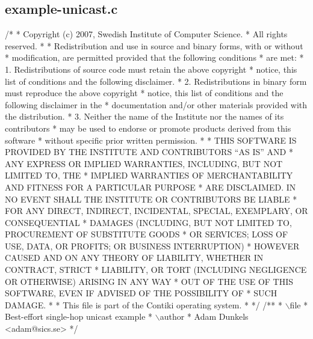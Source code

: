 \hypertarget{a00036}{}\subsection{example-\/unicast.\+c}

\begin{DoxyCodeInclude}
\textcolor{comment}{/*}
\textcolor{comment}{ * Copyright (c) 2007, Swedish Institute of Computer Science.}
\textcolor{comment}{ * All rights reserved.}
\textcolor{comment}{ *}
\textcolor{comment}{ * Redistribution and use in source and binary forms, with or without}
\textcolor{comment}{ * modification, are permitted provided that the following conditions}
\textcolor{comment}{ * are met:}
\textcolor{comment}{ * 1. Redistributions of source code must retain the above copyright}
\textcolor{comment}{ *    notice, this list of conditions and the following disclaimer.}
\textcolor{comment}{ * 2. Redistributions in binary form must reproduce the above copyright}
\textcolor{comment}{ *    notice, this list of conditions and the following disclaimer in the}
\textcolor{comment}{ *    documentation and/or other materials provided with the distribution.}
\textcolor{comment}{ * 3. Neither the name of the Institute nor the names of its contributors}
\textcolor{comment}{ *    may be used to endorse or promote products derived from this software}
\textcolor{comment}{ *    without specific prior written permission.}
\textcolor{comment}{ *}
\textcolor{comment}{ * THIS SOFTWARE IS PROVIDED BY THE INSTITUTE AND CONTRIBUTORS ``AS IS'' AND}
\textcolor{comment}{ * ANY EXPRESS OR IMPLIED WARRANTIES, INCLUDING, BUT NOT LIMITED TO, THE}
\textcolor{comment}{ * IMPLIED WARRANTIES OF MERCHANTABILITY AND FITNESS FOR A PARTICULAR PURPOSE}
\textcolor{comment}{ * ARE DISCLAIMED.  IN NO EVENT SHALL THE INSTITUTE OR CONTRIBUTORS BE LIABLE}
\textcolor{comment}{ * FOR ANY DIRECT, INDIRECT, INCIDENTAL, SPECIAL, EXEMPLARY, OR CONSEQUENTIAL}
\textcolor{comment}{ * DAMAGES (INCLUDING, BUT NOT LIMITED TO, PROCUREMENT OF SUBSTITUTE GOODS}
\textcolor{comment}{ * OR SERVICES; LOSS OF USE, DATA, OR PROFITS; OR BUSINESS INTERRUPTION)}
\textcolor{comment}{ * HOWEVER CAUSED AND ON ANY THEORY OF LIABILITY, WHETHER IN CONTRACT, STRICT}
\textcolor{comment}{ * LIABILITY, OR TORT (INCLUDING NEGLIGENCE OR OTHERWISE) ARISING IN ANY WAY}
\textcolor{comment}{ * OUT OF THE USE OF THIS SOFTWARE, EVEN IF ADVISED OF THE POSSIBILITY OF}
\textcolor{comment}{ * SUCH DAMAGE.}
\textcolor{comment}{ *}
\textcolor{comment}{ * This file is part of the Contiki operating system.}
\textcolor{comment}{ *}
\textcolor{comment}{ */}
\textcolor{comment}{}
\textcolor{comment}{/**}
\textcolor{comment}{ * \(\backslash\)file}
\textcolor{comment}{ *         Best-effort single-hop unicast example}
\textcolor{comment}{ * \(\backslash\)author}
\textcolor{comment}{ *         Adam Dunkels <adam@sics.se>}
\textcolor{comment}{ */}


\end{DoxyCodeInclude}
